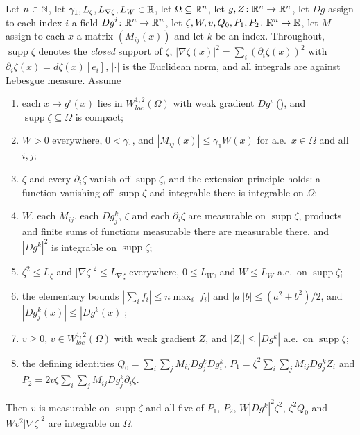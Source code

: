 \begin{helper}
Let $n\in\mathbb{N}$, let $\gamma_1,L_\zeta,L_{\nabla\zeta},L_W\in\mathbb{R}$, let
$\Omega\subseteq\mathbb{R}^n$, let $g,Z\colon\mathbb{R}^n\to\mathbb{R}^n$, let $Dg$ assign to each
index $i$ a field $Dg^i\colon\mathbb{R}^n\to\mathbb{R}^n$, let
$\zeta,W,v,Q_0,P_1,P_2\colon\mathbb{R}^n\to\mathbb{R}$, let $M$ assign to each $x$ a matrix
$(M_{ij}(x))$ and let $k$ be an index.  Throughout,
$\operatorname{supp}\zeta$ denotes the \emph{closed} support of $\zeta$,
$|\nabla\zeta(x)|^2=\sum_i(\partial_i\zeta(x))^2$ with
$\partial_i\zeta(x)=d\zeta(x)[e_i]$, $|\cdot|$ is the Euclidean norm, and all
integrals are against Lebesgue measure.  Assume
\begin{enumerate}
\item[(H1)] each $x\mapsto g^i(x)$ lies in $W^{1,2}_{loc}(\Omega)$ with weak
  gradient $Dg^i$ (), and
  $\operatorname{supp}\zeta\subseteq\Omega$ is compact;
\item[(H2)] $W>0$ everywhere, $0<\gamma_1$, and
  $|M_{ij}(x)|\le\gamma_1W(x)$ for a.e.\ $x\in\Omega$ and all $i,j$;
\item[(H3)] $\zeta$ and every $\partial_i\zeta$ vanish off
  $\operatorname{supp}\zeta$, and the extension principle holds: a function
  vanishing off $\operatorname{supp}\zeta$ and integrable there is integrable
  on $\Omega$;
\item[(H4)] $W$, each $M_{ij}$, each $Dg^k_j$, $\zeta$ and each
  $\partial_i\zeta$ are measurable on $\operatorname{supp}\zeta$, products and
  finite sums of functions measurable there are measurable there, and
  $|Dg^k|^2$ is integrable on $\operatorname{supp}\zeta$;
\item[(H5)] $\zeta^2\le L_\zeta$ and $|\nabla\zeta|^2\le L_{\nabla\zeta}$
  everywhere, $0\le L_W$, and $W\le L_W$ a.e.\ on $\operatorname{supp}\zeta$;
\item[(H6)] the elementary bounds $|\sum_if_i|\le n\max_i|f_i|$ and
  $|a||b|\le(a^2+b^2)/2$, and $|Dg^k_j(x)|\le|Dg^k(x)|$;
\item[(H7)] $v\ge0$, $v\in W^{1,2}_{loc}(\Omega)$ with weak gradient $Z$, and
  $|Z_i|\le|Dg^k|$ a.e.\ on $\operatorname{supp}\zeta$;
\item[(H8)] the defining identities
  $Q_0=\sum_i\sum_jM_{ij}Dg^k_jDg^k_i$,
  $P_1=\zeta^2\sum_i\sum_jM_{ij}Dg^k_jZ_i$ and
  $P_2=2v\zeta\sum_i\sum_jM_{ij}Dg^k_j\partial_i\zeta$.
\end{enumerate}
Then $v$ is measurable on $\operatorname{supp}\zeta$ and all five of $P_1$,
$P_2$, $W|Dg^k|^2\zeta^2$, $\zeta^2Q_0$ and $Wv^2|\nabla\zeta|^2$ are
integrable on $\Omega$.
\end{helper}
